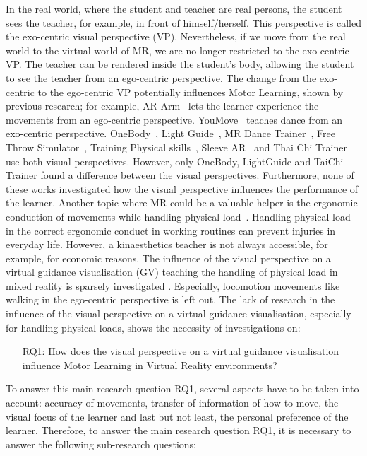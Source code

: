 In the real world, where the student and teacher are real persons, the student sees the teacher, for example, in front of himself/herself. This perspective is called the exo-centric visual perspective (VP). Nevertheless, if we move from the real world to the virtual world of MR, we are no longer restricted to the exo-centric VP. The teacher can be rendered inside the student's body, allowing the student to see the teacher from an ego-centric perspective. The change from the exo-centric to the ego-centric VP potentially influences Motor Learning, shown by previous research; for example, AR-Arm~\cite{ararm} lets the learner experience the movements from an ego-centric perspective. YouMove~\cite{YouMove} teaches dance from an exo-centric perspective. OneBody~\cite{onebody}, Light Guide~\cite{lightguide}, MR Dance Trainer~\cite{mrdancetrainer}, Free Throw Simulator~\cite{freethrowsimulator}, Training Physical skills~\cite{trainingphysicalskills}, Sleeve AR~\cite{sleevear} and Thai Chi Trainer~\cite{thaichichua} use both visual perspectives. However, only OneBody, LightGuide and TaiChi Trainer found a difference between the visual perspectives. Furthermore, none of these works investigated how the visual perspective influences the performance of the learner. Another topic where MR could be a valuable helper is the ergonomic conduction of movements while handling physical load~\cite{nursecare,kitt}. Handling physical load in the correct ergonomic conduct in working routines can prevent injuries in everyday life. However, a kinaesthetics teacher is not always accessible, for example, for economic reasons. The influence of the visual perspective on a virtual guidance visualisation (GV) teaching the handling of physical load in mixed reality is sparsely investigated  . Especially, locomotion movements like walking in the ego-centric perspective is left out. The lack of research in the influence of the visual perspective on a virtual guidance visualisation, especially for handling physical loads, shows the necessity of investigations on:
\begin{itemize}
	\item[RQ1:] How does the visual perspective on a virtual guidance visualisation influence Motor Learning in Virtual Reality environments?
\end{itemize}
To answer this main research question RQ1, several aspects have to be taken into account: accuracy of movements, transfer of information of how to move, the visual focus of the learner and last but not least, the personal preference of the learner. Therefore, to answer the main research question RQ1, it is necessary to answer the following sub-research questions:
